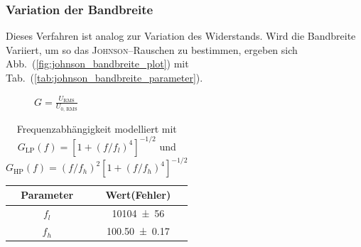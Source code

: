 \documentclass[sn-mathphys-num,iicol]{sn-jnl}
\theoremstyle{thmstyleone}
\theoremstyle{thmstyletwo}
\theoremstyle{thmstylethree}
\begin{document}
\subsubsection{Variation der Bandbreite}
Dieses Verfahren ist analog zur Variation des Widerstands.
Wird die Bandbreite Variiert, um so das \textsc{Johnson}--Rauschen zu bestimmen, ergeben sich Abb.\ (\ref{fig:johnson_bandbreite_plot}) mit Tab.\ (\ref{tab:johnson_bandbreite_parameter}).

\begin{figure}[h]
	\centering
	\resizebox{.5\textwidth}{!}{}
	\caption{$G=\frac{U_{\text{RMS}}}{U_{0\text{, RMS}}}$}
\end{figure}
\begin{table}[h!]
	\centering
	\begin{tabular}{cc}
		\textbf{Parameter} & {\textbf{Wert(Fehler)}} \\
		\hline
		$f_l$              & \SI{10104 \pm 56}{}     \\
		$f_h$              & \SI{100.50 \pm 0.17}{}  \\
	\end{tabular}
	\label{tab:parameter}
	\caption{Frequenzabhängigkeit modelliert mit $G_\text{LP}(f)=\left[1+(f/f_l)^4\right]^{-1/2}$ und $G_\text{HP}(f)=(f/f_h)^2\left[1+(f/f_h)^4\right]^{-1/2}$}
\end{table}
\end{document}
